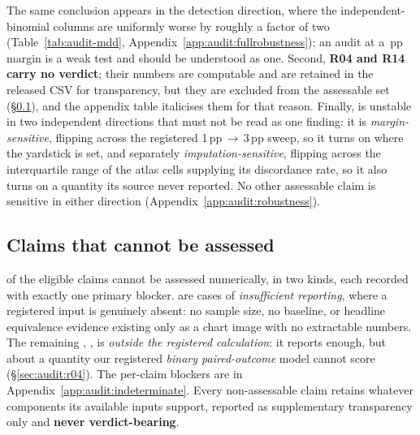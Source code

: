 The same conclusion appears in the detection direction, where the
independent-binomial columns are uniformly worse by roughly a factor of two
(Table~\ref{tab:audit-mdd}, Appendix~\ref{app:audit:fullrobustness}); an audit at
a \AuditMarginPP{}\,pp margin is a weak test and should be understood as one.
Second, \textbf{R04 and R14 carry no verdict}; their numbers are computable and
are retained in the released CSV for transparency, but they are excluded from
the assessable set (\S\ref{sec:audit:indeterminate}), and the appendix table
italicises them for that reason. Finally, \AuditSensitiveClaim{} is unstable in
two independent directions that must not be read as one finding: it is
\emph{margin-sensitive}, flipping across the registered
1\,pp\,$\to$\,3\,pp sweep, so it turns on where the yardstick is set, and
separately \emph{imputation-sensitive}, flipping across the interquartile range
of the atlas cells supplying its discordance rate, so it also turns on a
quantity its source never reported. No other assessable claim is sensitive in
either direction (Appendix~\ref{app:audit:robustness}).

\subsection{Claims that cannot be assessed}
\label{sec:audit:indeterminate}

\AuditNotAssessable{} of the \AuditEligible{} eligible claims cannot be assessed
numerically, in two kinds, each recorded with exactly one primary blocker.
\AuditNotAssessableInsufficient{} are cases of \emph{insufficient reporting},
where a registered input is genuinely absent: no sample size, no baseline, or
headline equivalence evidence existing only as a chart image with no extractable
numbers. The remaining \AuditNotAssessableOutsideFramework{},
\AuditOutsideFrameworkClaim{}, is \emph{outside the registered calculation}: it
reports enough, but about a quantity our registered \emph{binary paired-outcome}
model cannot score (\S\ref{sec:audit:r04}). The per-claim blockers are in
Appendix~\ref{app:audit:indeterminate}. Every non-assessable claim retains
whatever components its available inputs support, reported as supplementary
transparency only and \textbf{never verdict-bearing}.

